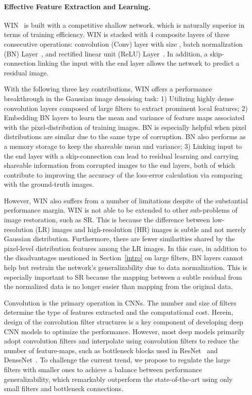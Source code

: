 \documentclass[10pt,twocolumn,letterpaper]{article}
\begin{document}
 
\paragraph{Effective Feature Extraction and Learning.}WIN~\cite{DBLP:journals/corr/LiuF17} is built with a competitive shallow network. which is naturally superior in terms of training efficiency. WIN is stacked with 4 composite layers of three consecutive operations: convolution (Conv) layer with size , batch normalization (BN) Layer~\cite{ioffe2015batch}, and rectified linear unit (ReLU) Layer~\cite{nair2010rectified}. In addition, a skip-connection linking the input with the end layer allows the network to predict a residual image.

With the following three key contributions, WIN offers a performance breakthrough in the Gaussian image denoising task: 1) Utilizing highly dense convolution layers composed of large filters to extract prominent local features;  2) Embedding BN layers to learn the mean and variance of feature maps associated with the pixel-distribution of training images. BN is especially helpful when pixel distributions are similar due to the same type of corruption. BN also performs as a memory storage to keep the shareable mean and variance; 3) Linking input to the end layer with a skip-connection can lead to residual learning and carrying shareable information from corrupted images to the end layers, both of which contribute to improving the accuracy of the loss-error calculation via comparing with the ground-truth images.

However, WIN also suffers from a number of limitations despite of the substantial performance margin. WIN is not able to be extended to other sub-problems of image restoration, such as SR. This is because the difference between low-resolution (LR) images and high-resolution (HR) images is subtle and not merely Gaussian distribution. Furthermore, there are fewer similarities shared by the pixel-level distribution features among the LR images. In this case, in addition to the disadvantages mentioned in Section~\ref{intro} on large filters, BN layers cannot help but restrain the network's generalizability due to data normalization. This is especially important to SR because the mapping between a subtle residual from the normalized data is no longer easier than mapping from the original data.

Convolution is the primary operation in CNNs. The number and size of filters determine the type of features extracted and the computational cost. Herein, design of the convolution filter structures is a key component of developing deep CNN models to optimize the performance. However, most deep models primarily adopt  convolution filters and interpolate using  convolution filters to reduce the number of feature-maps, such as bottleneck blocks used in ResNet~\cite{he2016deep} and DenseNet~\cite{huang2016densely}. To challenge the current trend, we propose to regulate the large filters with smaller ones to achieve a balance between performance generalizability, which remarkably outperform the state-of-the-art using only small filters and bottleneck connections. 
\end{document}
